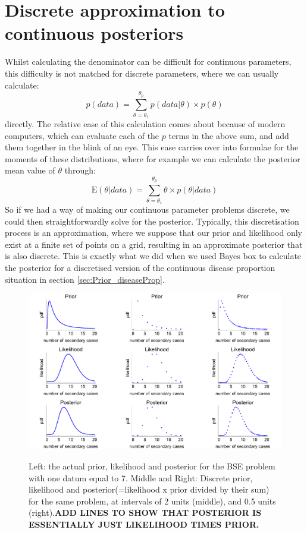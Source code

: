 \documentclass[11pt,fullpage]{book}
\begin{document}
\section{Discrete approximation to continuous posteriors}\label{sec:MCMC_discreteApproximation}
Whilst calculating the denominator can be difficult for continuous parameters, this difficulty is not matched for discrete parameters, where we can usually calculate:
%
\begin{equation}
p(data) = \sum\limits_{\theta=\theta_1}^{\theta_p} p(data|\theta) \times p(\theta)
\end{equation}
%
directly. The relative ease of this calculation comes about because of modern computers, which can evaluate each of the $p$ terms in the above sum, and add them together in the blink of an eye. This ease carries over into formulae for the moments of these distributions, where for example we can calculate the posterior mean value of $\theta$ through:
%
\begin{equation}
\mathrm{E}(\theta|data) = \sum\limits_{\theta=\theta_1}^{\theta_p} \theta \times p(\theta|data) 
\end{equation}
%
So if we had a way of making our continuous parameter problems discrete, we could then straightforwardly solve for the posterior. Typically, this discretisation process is an approximation, where we suppose that our prior and likelihood only exist at a finite set of points on a grid, resulting in an approximate posterior that is also discrete. This is exactly what we did when we used Bayes box to calculate the posterior for a discretised version of the continuous disease proportion situation in section \ref{sec:Prior_diseaseProp}.

\begin{figure}
\centering
\scalebox{0.4} 
{\includegraphics{MCMC_discreteApproxBSE.pdf}}
\caption{Left: the actual prior, likelihood and posterior for the BSE problem with one datum equal to 7. Middle and Right: Discrete prior, likelihood and posterior(=likelihood x prior divided by their sum) for the same problem, at intervals of 2 units (middle), and 0.5 units (right).\textbf{ADD LINES TO SHOW THAT POSTERIOR IS ESSENTIALLY JUST LIKELIHOOD TIMES PRIOR.}}\label{fig:MCMC_discreteApproxBSE}
\end{figure}
\end{document}
